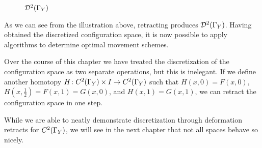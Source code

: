 \begin{figure}[h]
\caption{$\mathcal{D}^2(\Gamma_Y)$}\label{fig:disc}
\centering
\end{figure}

As we can see from the illustration above, retracting \C produces $\mathcal{D}^2(\Gamma_Y)$. Having obtained the discretized configuration space, it is now possible to apply algorithms to determine optimal movement schemes.

Over the course of this chapter we have treated the discretization of the configuration space as two separate operations, but this is inelegant. If we define another homotopy $H\colon C^2(\Gamma_Y)\times I \rightarrow C^2(\Gamma_Y)$ such that $H(x,0)=F(x,0)$, $H(x,\frac{1}{2}) = F(x,1) = G(x,0)$, and $H(x,1)=G(x,1)$, we can retract the configuration space in one step.

While we are able to neatly demonstrate discretization through deformation retracts for $C^2(\Gamma_Y)$, we will see in the next chapter that not all spaces behave so nicely.
